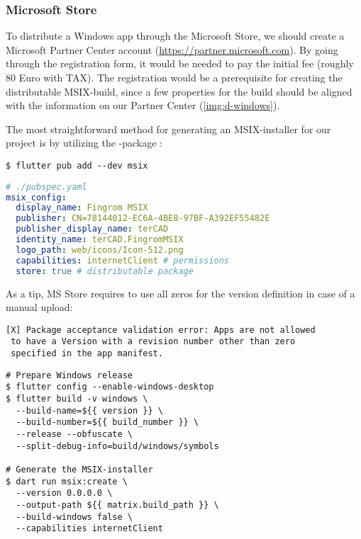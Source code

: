 
\subsubsection{Microsoft Store}

To distribute a Windows app through the Microsoft Store, we should create a Microsoft Partner Center account
(\href{https://partner.microsoft.com}{https://partner.microsoft.com}). By going through the registration form, it 
would be needed to pay the initial fee (roughly 80 Euro with TAX). The registration would be a prerequisite for 
creating the distributable MSIX-build, since a few properties for the build should be aligned with the information on 
our Partner Center (\cref{img:d-windows}). 

The most straightforward method for generating an MSIX-installer for our project is by utilizing the 
-package :

\begin{lstlisting}[language=terminal]
$ flutter pub add --dev msix
\end{lstlisting}

\begin{lstlisting}[language=yaml]
# ./pubspec.yaml
msix_config:
  display_name: Fingrom MSIX
  publisher: CN=78144012-EC6A-4BE8-97BF-A392EF55482E
  publisher_display_name: terCAD
  identity_name: terCAD.FingromMSIX
  logo_path: web/icons/Icon-512.png
  capabilities: internetClient # permissions
  store: true # distributable package
\end{lstlisting}


\noindent As a tip, MS Store requires to use all zeros for the version definition in case of a manual upload:

\begin{lstlisting}[language=terminal]
[X] Package acceptance validation error: Apps are not allowed
 to have a Version with a revision number other than zero 
 specified in the app manifest.
\end{lstlisting}

\begin{lstlisting}[language=terminal]
# Prepare Windows release
$ flutter config --enable-windows-desktop
$ flutter build -v windows \
  --build-name=${{ version }} \
  --build-number=${{ build_number }} \
  --release --obfuscate \
  --split-debug-info=build/windows/symbols

# Generate the MSIX-installer
$ dart run msix:create \
  --version 0.0.0.0	\
  --output-path ${{ matrix.build_path }} \
  --build-windows false \
  --capabilities internetClient
\end{lstlisting}

